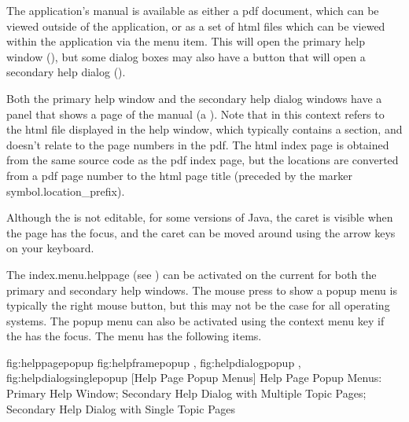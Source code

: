 

The application's manual is available as either a \gls{pdf}
document, which can be viewed outside of the application, or as a
set of \gls{html} files which can be viewed within the application
via the  menu item. This will open the primary
help window (), but some dialog boxes
may also have a  button that will open a secondary help
dialog ().

Both the primary help window and the secondary help dialog windows
have a panel that shows a page of the manual (a
).  Note that  in this
context refers to the \gls{html} file displayed in the help window, which
typically contains a section, and doesn't relate to the page numbers
in the \gls{pdf}. The \gls{html} index page is obtained from the
same source code as the \gls{pdf} index page, but the locations are
converted from a \gls{pdf} page number to the \gls{html} page title
(preceded by the marker \gls{symbol.location_prefix}).

Although the  is not editable, for some versions of
Java, the caret is visible when the page has the focus, and
the caret can be moved around using the arrow keys on your keyboard.


The \gls{index.menu.helppage} (see )
can be activated on the current  for both the
primary and secondary help windows. The mouse press to show a popup
menu is typically the right mouse button, but this may not be the
case for all operating systems.  The popup menu can also be
activated using the context menu  key if the
 has the focus.  The menu has the following items.

\FloatSubFigs
{fig:helppagepopup}
 {
   {fig:helpframepopup}
   {%
   }
   {},
   {fig:helpdialogpopup}
   {%
   }
   {},
   {fig:helpdialogsinglepopup}
   {%
   }
   {}
}
[Help Page Popup Menus]
{Help Page Popup Menus: 
  Primary Help Window;
  Secondary Help Dialog
 with Multiple Topic Pages;
  Secondary Help Dialog
 with Single Topic Pages}

